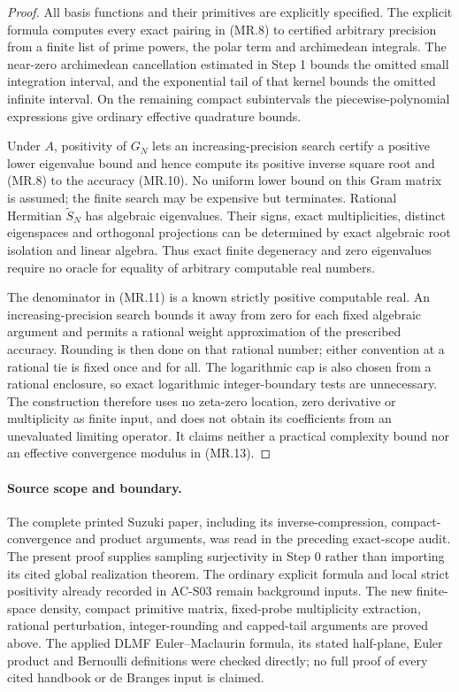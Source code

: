 \begin{proof}
All basis functions and their primitives are explicitly specified.
The explicit formula computes every exact pairing in (MR.8) to
certified arbitrary precision from a finite list of prime powers,
the polar term and archimedean integrals.  The near-zero
archimedean cancellation estimated in Step 1 bounds the omitted
small integration interval, and the exponential tail of that
kernel bounds the omitted infinite interval.  On the remaining
compact subintervals the piecewise-polynomial expressions give
ordinary effective quadrature bounds.

Under \(A\), positivity of \(G_N\) lets an increasing-precision
search certify a positive lower eigenvalue bound and hence compute
its positive inverse square root and (MR.8) to the accuracy
(MR.10).  No uniform lower bound on this Gram matrix is assumed;
the finite search may be expensive but terminates.
Rational Hermitian \(\widetilde S_N\) has algebraic eigenvalues.
Their signs, exact multiplicities, distinct eigenspaces and
orthogonal projections can be determined by exact algebraic
root isolation and linear algebra.  Thus exact finite degeneracy
and zero eigenvalues require no oracle for equality of arbitrary
computable real numbers.

The denominator in (MR.11) is a known strictly positive computable
real.  An increasing-precision search bounds it away from zero
for each fixed algebraic argument and permits a rational weight
approximation of the prescribed accuracy.  Rounding is then done
on that rational number; either convention at a rational tie is
fixed once and for all.  The logarithmic cap is also chosen from
a rational enclosure, so exact logarithmic integer-boundary tests
are unnecessary.  The construction therefore uses no zeta-zero
location, zero derivative or multiplicity as finite input, and
does not obtain its coefficients from an unevaluated limiting
operator.  It claims neither a practical complexity bound nor
an effective convergence modulus in (MR.13).
\end{proof}

\paragraph{Source scope and boundary.}
The complete printed Suzuki paper, including its inverse-compression,
compact-convergence and product arguments, was read in the preceding
exact-scope audit.  The present proof supplies sampling surjectivity
in Step 0 rather than importing its cited global realization theorem.
The ordinary explicit formula and local strict positivity already
recorded in AC-S03 remain background inputs.  The new finite-space
density, compact primitive matrix, fixed-probe multiplicity extraction,
rational perturbation, integer-rounding and capped-tail arguments
are proved above.
The applied DLMF Euler--Maclaurin formula, its stated half-plane,
Euler product and Bernoulli definitions were checked directly;
no full proof of every cited handbook or de Branges input is claimed.

